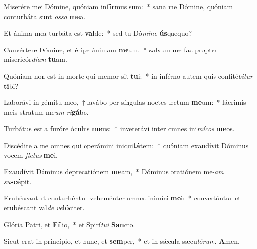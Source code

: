 \item Miserére mei Dómine, quóniam in\textbf{fír}mus sum:~* sana me Dómine, quóniam conturbáta sunt \textit{ossa} \textbf{me}a.
\item Et ánima mea turbáta est \textbf{val}de:~* sed tu Dó\textit{mine} \textbf{ús}quequo?
\item Convértere Dómine, et éripe ánimam \textbf{me}am:~* salvum me fac propter misericór\textit{diam} \textbf{tu}am.
\item Quóniam non est in morte qui memor sit \textbf{tu}i:~* in inférno autem quis confité\textit{bitur} \textbf{ti}bi?
\item Laborávi in gémitu meo,~† lavábo per síngulas noctes lectum \textbf{me}um:~* lácrimis meis stratum me\tinyhspace\textit{um} \textit{ri}\textbf{gá}bo.
\item Turbátus est a furóre óculus \textbf{me}us:~* inveterávi inter omnes ini\textit{mícos} \textbf{me}os.
\item Discédite a me omnes qui operámini iniqui\textbf{tá}tem:~* quóniam exaudívit Dóminus vocem \textit{fletus} \textbf{me}i.
\item Exaudívit Dóminus deprecatiónem \textbf{me}am,~* Dóminus oratiónem me-\textit{am} \textit{su}\textbf{scé}pit.
\item Erubéscant et conturbéntur veheménter omnes inimíci \textbf{me}i:~* convertántur et erubéscant val\tinyhspace\textit{de} \textit{ve}\textbf{ló}citer.
\item Glória Patri, et \textbf{Fí}lio,~* et Spirí\tinyhspace\textit{tui} \textbf{San}cto.
\item Sicut erat in princípio, et nunc, et \textbf{sem}per,~* et in sǽcula sæcu\tinyhspace\textit{lórum.} \textbf{A}men.
